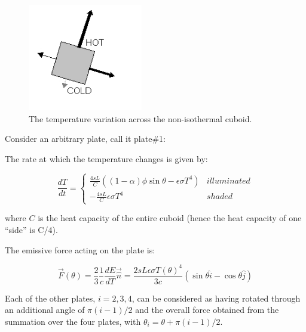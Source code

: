 \begin{description}
\begin{enumerate}
\begin{enumerate}
\begin{enumerate}
            \begin{figure}[!ht]
             \begin{center}
             \includegraphics[width=50mm]{figs/isoth_app/iso_app_figs2.jpg}
             \end{center}
             \caption{The temperature variation across the non-isothermal
               cuboid.}
             \label{fig:ivv_isotherm_fig2}
           \end{figure}


            Consider an arbitrary plate, call it plate\#1:

            The rate at which the temperature changes is
            given by:

            \begin{equation*}
              \frac{dT}{dt} =
              \begin{cases}
                \frac{4sL}{C} \left((1-\alpha) \phi \sin
                \theta - \epsilon \sigma T^{4} \right) & illuminated \\
                -\frac{4sL}{C} \epsilon \sigma T^{4}  & shaded
              \end{cases}
             \end{equation*}

            where $C$ is the heat capacity of the entire cuboid (hence the heat
            capacity of one ``side'' is C/4).

            The emissive force acting on the plate is:

            \begin{equation*}
						\vec {F}(\theta) = \frac{2}{3} \frac{1}{c} \frac{dE}{dT} \vec \hat
						{n} = \frac {2sL \epsilon \sigma T(\theta)^{4}}{3c}
            \left(\sin \theta \hat {i} - \cos \theta \hat {j} \right)
            \end{equation*}

            Each of the other plates, $i=2,3,4$, can be considered as having
            rotated through an additional angle of $\pi (i-1) /2$ and the overall force
            obtained from the summation over the four plates, with
            $\theta_{i}=\theta + \pi (i-1) /2$.


\end{enumerate}
\end{enumerate}
\end{enumerate}
\end{description}
